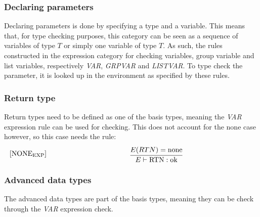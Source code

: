 \subsubsection{Declaring parameters}
Declaring parameters is done by specifying a type and a variable. This means that, for type checking purposes, this category can be seen as a sequence of variables of type $T$ or simply one variable of type $T$. As such, the rules constructed in the expression category for checking variables, group variable and list variables, respectively \textit{VAR}, \textit{GRPVAR} and \textit{LISTVAR}. To type check the parameter, it is looked up in the environment as specified by these rules.
\subsubsection{Return type}
Return types need to be defined as one of the basis types, meaning the \textit{VAR} expression rule can be used for checking. This does not account for the none case however, so this case needs the rule:
\begin{equation}
\begin{minipage}{.2\linewidth}
$[\text{NONE}_\text{EXP}]$
\end{minipage}
\begin{minipage}{.8\linewidth}
\centering
 $\cfrac {E(RTN) = \text{none}}{E \vdash \text{RTN} : \text{ok}}$
\end{minipage}
\end{equation}
\subsubsection{Advanced data types}
The advanced data types are part of the basis types, meaning they can be check through the \textit{VAR} expression check.